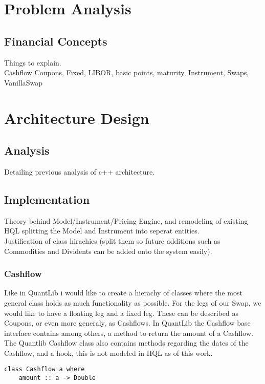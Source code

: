 \documentclass{article}
\begin{document}
\section{Problem Analysis}

\subsection{Financial Concepts}

Things to explain.\\
Cashflow Coupons, Fixed, LIBOR, basic points, maturity, Instrument, Swaps, VanillaSwap\\



\section{Architecture Design}
\subsection{Analysis}
Detailing previous analysis of c++ architecture.\\

\subsection{Implementation}
Theory behind Model/Instrument/Pricing Engine, and remodeling of existing HQL splitting
the Model and Instrument into seperat entities.\\
Justification of class hirachies (split them so future additions such as Commodities and Dividents
can be added onto the system easily).


\subsubsection{Cashflow}
Like in QuantLib i would like to create a hierachy of classes where the 
most general class holds as much functionality as possible. For the legs
of our Swap, we would like to have a floating leg and a fixed leg. These
can be described as Coupons, or even more generaly, as Cashflows. 
In QuantLib the Cashflow base interface contains among others, a method
to return the amount of a Cashflow. The Quantlib Cashflow class also contains
methods regarding the dates of the Cashflow, and a hook, this is not modeled
in HQL as of this work. 

\begin{verbatim}
class Cashflow a where 
    amount :: a -> Double        
\end{verbatim}
\end{document}
